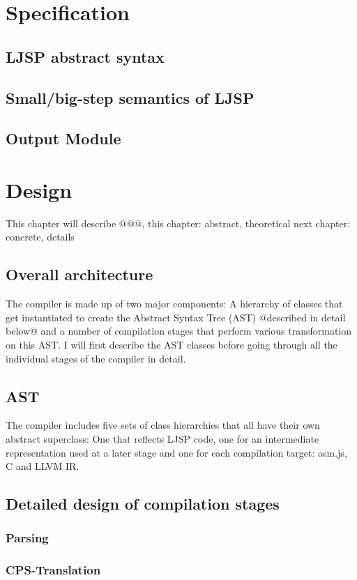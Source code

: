 \documentclass[11pt]{report}
\begin{document}
\chapter{Specification}
\section{LJSP abstract syntax}
\section{Small/big-step semantics of LJSP}
\section{Output Module}

\chapter{Design}
This chapter will describe @@@, this chapter: abstract, theoretical next chapter: concrete, details
\section{Overall architecture}
The compiler is made up of two major components: A hierarchy of classes that get instantiated to create the Abstract Syntax Tree (AST) @described in detail below@ and a number of compilation stages that perform various transformation on this AST. I will first describe the AST classes before going through all the individual stages of the compiler in detail.
\section{AST}
The compiler includes five sets of class hierarchies that all have their own abstract superclass: One that reflects LJSP code, one for an intermediate representation used at a later stage and one for each compilation target: asm.js, C and LLVM IR.
\section{Detailed design of compilation stages}
\subsection{Parsing}
\subsection{CPS-Translation}
\end{document}
